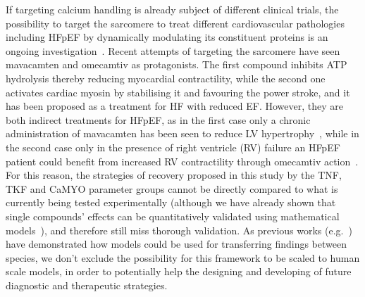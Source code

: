 If targeting calcium handling is already subject of different clinical trials, the possibility to target the sarcomere to treat different cardiovascular pathologies including HFpEF by dynamically modulating its constituent proteins is an ongoing investigation~\cite{Patel:2019}. Recent attempts of targeting the sarcomere have seen mavacamten and omecamtiv as protagonists. The first compound inhibits ATP hydrolysis thereby reducing myocardial contractility, while the second one activates cardiac myosin by stabilising it and favouring the power stroke, and it has been proposed as a treatment for HF with reduced EF. However, they are both indirect treatments for HFpEF, as in the first case only a chronic administration of mavacamten has been seen to reduce LV hypertrophy~\cite{Green:2016}, while in the second case only in the presence of right ventricle (RV) failure an HFpEF patient could benefit from increased RV contractility through omecamtiv action~\cite{Planelles-Herrero:2017}. For this reason, the strategies of recovery proposed in this study by the TNF, TKF and CaMYO parameter groups cannot be directly compared to what is currently being tested experimentally (although we have already shown that single compounds' effects can be quantitatively validated using mathematical models~\cite{Longobardi:2021}), and therefore still miss thorough validation. As previous works (e.g.~\cite{Fernandez-Chas:2018}) have demonstrated how models could be used for transferring findings between species, we don't exclude the possibility for this framework to be scaled to human scale models, in order to potentially help the designing and developing of future diagnostic and therapeutic strategies.

\vspace{0.2cm}\noindent
{}

